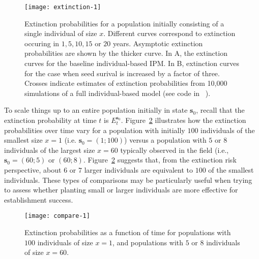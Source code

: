 \documentclass[12pt]{amsart}\usepackage[]{graphicx}\usepackage[]{color}
\makeatletter
\def\maxwidth{ %
  \ifdim\Gin@nat@width>\linewidth
    \linewidth
  \else
    \Gin@nat@width
  \fi
}
\newenvironment{knitrout}{}{} %
\def\s{\mathbf s}
\makeatother
\begin{document}
\begin{knitrout}
\color{fgcolor}\begin{figure}
\texttt{[image: extinction-1]} \caption[Extinction probabilities for a population initially consisting of a single individual of size ]{Extinction probabilities for a population initially consisting of a single individual of size $x$. Different curves correspond to extinction occuring in $1, 5, 10, 15$ or $20$ years. Asymptotic extinction probabilities are shown by the thicker curve. In A, the extinction curves for the baseline individual-based IPM. In B, extinction curves for the case when seed surival is increased by a factor of three. Crosses indicate estimates of extinction probabilities from 10,000 simulations of a full individual-based model (see code in ~\citep{schreiber-ross-ibipm-code-2015}).}\label{fig:extinction}
\end{figure}


\end{knitrout}

To scale things up to an entire population initially in state $\s_0$, recall that the extinction probability at time $t$ is $E_t^{\s_0}$. Figure~\ref{fig:compare} illustrates how the extinction probabilities over time vary for a population with initially $100$ individuals of the smallest size $x=1$ (i.e. $\s_0=(1;100)$) versus a population with $5$ or $8$ individuals of the largest size $x=60$ typically observed in the field (i.e., $\s_0=(60;5)$ or $(60;8)$. Figure~\ref{fig:compare} suggests that, from the extinction risk perspective, about $6$ or $7$ larger individuals are equivalent to $100$ of the smallest individuals. These types of comparisons may be particularly useful when trying to assess whether planting small or larger individuals are more effective for establishment success.

\begin{knitrout}
\color{fgcolor}\begin{figure}
\texttt{[image: compare-1]} \caption[Extinction probabilities as a function of time for populations with ]{Extinction probabilities as a function of time for populations with $100$ individuals of size $x=1$, and populations with $5$ or $8$ individuals of size $x=60$.}\label{fig:compare}
\end{figure}


\end{knitrout}
\end{document}
